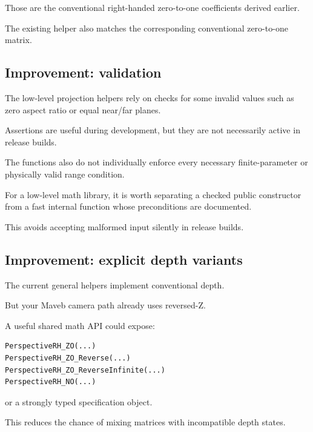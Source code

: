 Those are the conventional right-handed zero-to-one coefficients derived earlier.

The existing  helper also matches the corresponding conventional zero-to-one matrix.

\subsection{Improvement: validation}\label{02-foundations-ii-ch037-improvement-validation}

\hypertarget{02-foundations-ii-ch037-improvement-validation}{}

The low-level projection helpers rely on  checks for some invalid values such as zero aspect ratio or equal near/far planes.

Assertions are useful during development, but they are not necessarily active in release builds.

The functions also do not individually enforce every necessary finite-parameter or physically valid range condition.

For a low-level math library, it is worth separating a checked public constructor from a fast internal function whose preconditions are documented.

This avoids accepting malformed input silently in release builds.

\subsection{Improvement: explicit depth variants}\label{02-foundations-ii-ch037-improvement-explicit-depth-variants}

\hypertarget{02-foundations-ii-ch037-improvement-explicit-depth-variants}{}

The current general helpers implement conventional depth.

But your Maveb camera path already uses reversed-Z.

A useful shared math API could expose:

\begin{verbatim}
PerspectiveRH_ZO(...)
PerspectiveRH_ZO_Reverse(...)
PerspectiveRH_ZO_ReverseInfinite(...)
PerspectiveRH_NO(...)
\end{verbatim}

or a strongly typed specification object.

This reduces the chance of mixing matrices with incompatible depth states.

